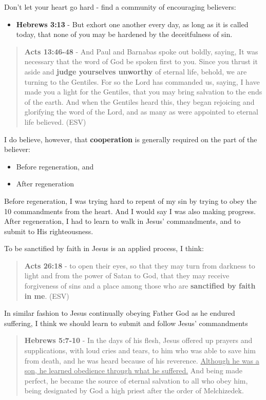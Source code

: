 \documentclass[11pt]{article}
\begin{document}
Don't let your heart go hard - find a community of encouraging believers:
\begin{itemize}
\item \textbf{Hebrews 3:13} - But exhort one another every day, as long as it is called today, that none of you may be hardened by the deceitfulness of sin.
\end{itemize}

\begin{quote}
\textbf{Acts 13:46-48} - And Paul and Barnabas spoke out boldly, saying, It was necessary that the word of God be spoken first to you.  Since you thrust it aside and \textbf{judge yourselves unworthy} of eternal life, behold, we are turning to the Gentiles.  For so the Lord has commanded us, saying, I have made you a light for the Gentiles, that you may bring salvation to the ends of the earth.  And when the Gentiles heard this, they began rejoicing and glorifying the word of the Lord, and as many as were appointed to eternal life believed. (ESV)
\end{quote}

I do believe, however, that \textbf{cooperation} is generally required on the part of the believer:
\begin{itemize}
\item Before regeneration, and
\item After regeneration
\end{itemize}

Before regeneration, I was trying hard to repent of my sin by trying to obey the 10 commandments from the heart.
And I would say I was also making progress.
After regeneration, I had to learn to walk in Jesus' commandments, and to submit to His righteousness.

To be sanctified by faith in Jesus is an applied process, I think:

\begin{quote}
\textbf{Acts 26:18} - to open their eyes, so that they may turn from darkness to light and from the power of Satan to God, that they may receive forgiveness of sins and a place among those who are \textbf{sanctified by faith in me}. (ESV)
\end{quote}

In similar fashion to Jesus continually obeying Father God as he endured suffering, I think we should learn to submit and follow Jesus' commandments

\begin{quote}
\textbf{Hebrews 5:7-10} - In the days of his flesh, Jesus offered up prayers and supplications, with loud cries and tears, to him who was able to save him from death, and he was heard because of his reverence. \uline{Although he was a son, he learned obedience through what he suffered.} And being made perfect, he became the source of eternal salvation to all who obey him, being designated by God a high priest after the order of Melchizedek.
\end{quote}
\end{document}
